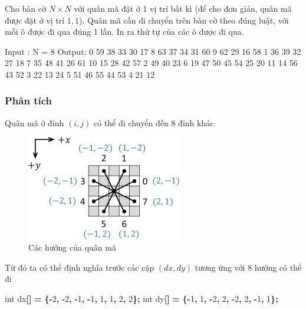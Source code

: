 \documentclass[
]{article}
\newenvironment{Shaded}{\begin{snugshade}}{\end{snugshade}}
\newcommand{\DataTypeTok}[1]{\textcolor[rgb]{0.13,0.29,0.53}{#1}}
\newcommand{\DecValTok}[1]{\textcolor[rgb]{0.00,0.00,0.81}{#1}}
\newcommand{\NormalTok}[1]{#1}
\newcommand{\OperatorTok}[1]{\textcolor[rgb]{0.81,0.36,0.00}{\textbf{#1}}}
\begin{document}
Cho bàn cờ \(N\times N\) với quân mã đặt ở 1 vị trí bất kì (để cho đơn
giản, quân mã được đặt ở vị trí \(1,1\)). Quân mã cần di chuyển trên bàn
cờ theo đúng luật, với mỗi ô được đi qua đúng 1 lần. In ra thứ tự của
các ô được đi qua.

\begin{Shaded}
\begin{Highlighting}[]
\NormalTok{Input : }
\NormalTok{N = 8}
\NormalTok{Output:}
\NormalTok{0  59  38  33  30  17   8  63}
\NormalTok{37  34  31  60   9  62  29  16}
\NormalTok{58   1  36  39  32  27  18   7}
\NormalTok{35  48  41  26  61  10  15  28}
\NormalTok{42  57   2  49  40  23   6  19}
\NormalTok{47  50  45  54  25  20  11  14}
\NormalTok{56  43  52   3  22  13  24   5}
\NormalTok{51  46  55  44  53   4  21  12}
\end{Highlighting}
\end{Shaded}

\hypertarget{phuxe2n-tuxedch}{%
\subsubsection{Phân tích}\label{phuxe2n-tuxedch}}

Quân mã ở đỉnh \((i, j)\) có thể di chuyển đến 8 đỉnh khác

\begin{figure}
\centering
\includegraphics{Homework 5 Trial and Error 3b646dc8160042df9d000a4baa7eeb4e/Untitled 1.png}
\caption{Các hướng của quân mã}
\end{figure}

Từ đó ta có thể định nghĩa trước các cặp \((dx, dy)\) tương ứng với 8
hướng có thể đi

\begin{Shaded}
\begin{Highlighting}[]
\DataTypeTok{int}\NormalTok{ dx}\OperatorTok{[]} \OperatorTok{=} \OperatorTok{\{{-}}\DecValTok{2}\OperatorTok{,} \OperatorTok{{-}}\DecValTok{2}\OperatorTok{,} \OperatorTok{{-}}\DecValTok{1}\OperatorTok{,} \OperatorTok{{-}}\DecValTok{1}\OperatorTok{,} \DecValTok{1}\OperatorTok{,} \DecValTok{1}\OperatorTok{,} \DecValTok{2}\OperatorTok{,} \DecValTok{2}\OperatorTok{\};}
\DataTypeTok{int}\NormalTok{ dy}\OperatorTok{[]} \OperatorTok{=} \OperatorTok{\{{-}}\DecValTok{1}\OperatorTok{,} \DecValTok{1}\OperatorTok{,} \OperatorTok{{-}}\DecValTok{2}\OperatorTok{,} \DecValTok{2}\OperatorTok{,} \OperatorTok{{-}}\DecValTok{2}\OperatorTok{,} \DecValTok{2}\OperatorTok{,} \OperatorTok{{-}}\DecValTok{1}\OperatorTok{,} \DecValTok{1}\OperatorTok{\};}
\end{Highlighting}
\end{Shaded}
\end{document}
